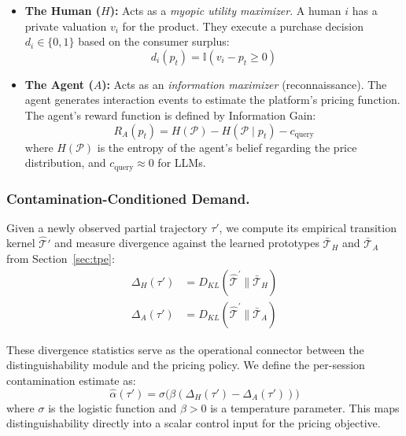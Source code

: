 \documentclass[sigconf]{acmart}
\begin{document}
\begin{itemize}
    \item \textbf{The Human ($H$):} Acts as a \textit{myopic utility maximizer}. A human $i$ has a private valuation $v_i$ for the product. They execute a purchase decision $d_i \in \{0, 1\}$ based on the consumer surplus:
    \begin{equation}
        d_i(p_t) = \mathbb{I}(v_i - p_t \geq 0)
    \end{equation}

    \item \textbf{The Agent ($A$):} Acts as an \textit{information maximizer} (reconnaissance). The agent generates interaction events to estimate the platform's pricing function. The agent's reward function is defined by Information Gain:
    \begin{equation}
        R_A(p_t) = H(\mathcal{P}) - H(\mathcal{P} \mid p_t) - c_{\text{query}}
    \end{equation}
    where $H(\mathcal{P})$ is the entropy of the agent's belief regarding the price distribution, and $c_{\text{query}} \approx 0$ for LLMs.
\end{itemize}

\subsubsection{Contamination-Conditioned Demand.}
Given a newly observed partial trajectory $\tau'$, we compute its empirical transition kernel $\hat{\mathcal{T}}'$ and measure divergence against the learned prototypes $\bar{\mathcal{T}}_H$ and $\bar{\mathcal{T}}_A$ from Section~\ref{sec:tpe}:
\begin{align}
  \Delta_H(\tau') &= D_{KL}(\hat{\mathcal{T}}^\prime \parallel \bar{\mathcal{T}}_H) \\
  \Delta_A(\tau') &= D_{KL}(\hat{\mathcal{T}}^\prime \parallel \bar{\mathcal{T}}_A)
\end{align}

These divergence statistics serve as the operational connector between the distinguishability module and the pricing policy. We define the per-session contamination estimate as:
\begin{equation}
\label{eq:alpha_hat}
    \hat{\alpha}(\tau') = \sigma\big(\beta(\Delta_H(\tau') - \Delta_A(\tau'))\big)
\end{equation}
where $\sigma$ is the logistic function and $\beta > 0$ is a temperature parameter. This maps distinguishability directly into a scalar control input for the pricing objective.
\end{document}

